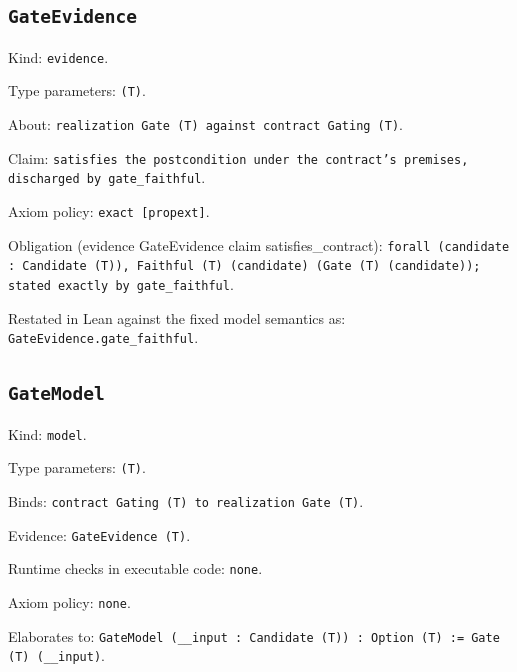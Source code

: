\documentclass[11pt]{article}
\begin{document}
\subsection*{\texttt{GateEvidence}}
\noindent Kind: \texttt{evidence}.\par
\noindent Type parameters: \texttt{(T)}.\par
\noindent About: \texttt{realization Gate (T) against contract Gating (T)}.\par
\noindent Claim: \texttt{satisfies the postcondition under the contract's premises, discharged by gate\_faithful}.\par
\noindent Axiom policy: \texttt{exact [propext]}.\par
\noindent Obligation (evidence GateEvidence claim satisfies\_contract): \texttt{forall (candidate : Candidate (T)), Faithful (T) (candidate) (Gate (T) (candidate)); stated exactly by gate\_faithful}.\par
\noindent Restated in Lean against the fixed model semantics as: \texttt{GateEvidence.gate\_faithful}.\par
\subsection*{\texttt{GateModel}}
\noindent Kind: \texttt{model}.\par
\noindent Type parameters: \texttt{(T)}.\par
\noindent Binds: \texttt{contract Gating (T) to realization Gate (T)}.\par
\noindent Evidence: \texttt{GateEvidence (T)}.\par
\noindent Runtime checks in executable code: \texttt{none}.\par
\noindent Axiom policy: \texttt{none}.\par
\noindent Elaborates to: \texttt{GateModel (\_\_input : Candidate (T)) : Option (T) := Gate (T) (\_\_input)}.\par
\end{document}
